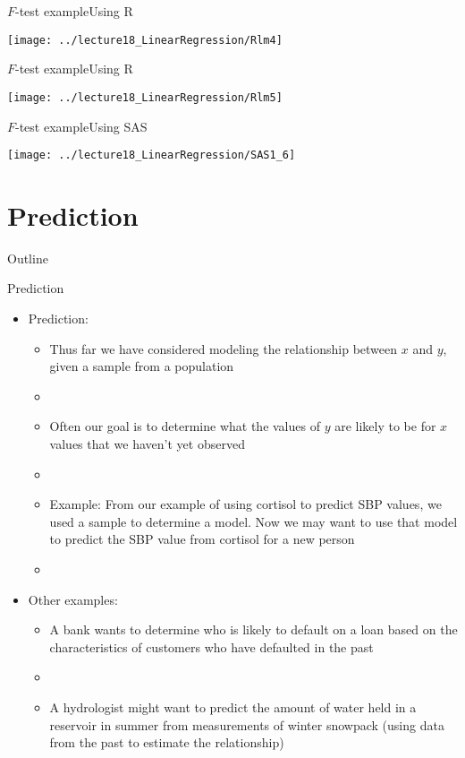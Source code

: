 \documentclass[xcolor=dvipsnames]{beamer}
\begin{document}
\begin{frame}{$F$-test example}{Using R}
	\begin{center}
		\texttt{[image: ../lecture18\_LinearRegression/Rlm4]}
	\end{center}
\end{frame}

\begin{frame}{$F$-test example}{Using R}
	\begin{center}
		\texttt{[image: ../lecture18\_LinearRegression/Rlm5]}
	\end{center}
\end{frame}

\begin{frame}{$F$-test example}{Using SAS}
	\begin{center}
		\texttt{[image: ../lecture18\_LinearRegression/SAS1\_6]}
	\end{center}
\end{frame}

\section{Prediction}

\begin{frame}{Outline}
\tableofcontents[currentsection,subsectionstyle=show/shaded/hide]
\end{frame}

\begin{frame}{Prediction}
	\begin{itemize}
		\item Prediction:
		\begin{itemize}
			\item Thus far we have considered modeling the relationship between $x$ and $y$, given a sample from a population
			\item[]
			\item Often our goal is to determine what the values of $y$ are likely to be for $x$ values that we haven't yet observed
			\item[]
			\item Example: From our example of using cortisol to predict SBP values, we used a sample to determine a model. Now we may want to use that model to predict the SBP value from cortisol for a new person 
			\item[]
		\end{itemize}
				\item Other examples:
	\begin{itemize}
		\item A bank wants to determine who is likely to default on a loan based on the characteristics of customers who have defaulted in the past
		\item[]
		\item A hydrologist might want to predict the amount of water held in a reservoir in summer from measurements of winter snowpack (using data from the past to estimate the relationship)
	\end{itemize}
	\end{itemize}
\end{frame}
\end{document}
